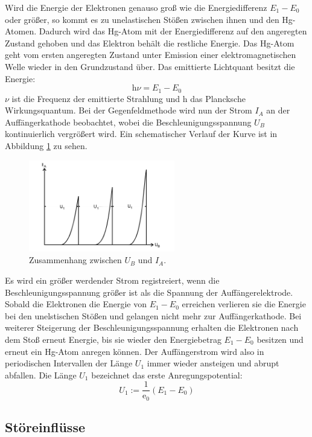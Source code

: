Wird die Energie der Elektronen genauso groß wie die Energiedifferenz $E_1 -E_0$ oder größer, so kommt es zu unelastischen Stößen zwischen ihnen und den Hg-Atomen.
Dadurch wird das Hg-Atom mit der Energiedifferenz auf den angeregten Zustand gehoben und das Elektron behält die restliche Energie.
Das Hg-Atom geht vom ersten angeregten Zustand unter Emission einer elektromagnetischen Welle wieder in den Grundzustand über.
Das emittierte Lichtquant besitzt die Energie:
\begin{equation}
    \text{h} \nu = E_1 - E_0
    \label{eqn:gl3}
\end{equation}
$\nu$ ist die Frequenz der emittierte Strahlung und h das Plancksche Wirkungsquantum.
Bei der Gegenfeldmethode wird nun der Strom $I_A$ an der Auffängerkathode beobachtet, wobei die Beschleunigungsspannung $U_B$ kontinuierlich vergrößert wird. 
Ein schematischer Verlauf der Kurve ist in Abbildung \ref{fig:abb2} zu sehen. 
\begin{figure}
    \centering
    \includegraphics[height=4.0cm]{data/abb2.jpg}
    \caption{Zusammenhang zwischen $U_B$ und $I_A$.  \cite{V601}}
    \label{fig:abb2}
\end{figure}
Es wird ein größer werdender Strom registreiert, wenn die Beschleunigungsspannung größer ist als die Spannung der Auffängerelektrode.
Sobald die Elektronen die Energie von $E_1 - E_0$ erreichen verlieren sie die Energie bei den unelstischen Stößen und gelangen nicht mehr zur Auffängerkathode.
Bei weiterer Steigerung der Beschleunigungsspannung erhalten die Elektronen nach dem Stoß erneut Energie, bis sie wieder den Energiebetrag $E_1 -E_0$ besitzen und erneut ein Hg-Atom anregen können.
Der Auffängerstrom wird also in periodischen Intervallen der Länge $U_1$ immer wieder ansteigen und abrupt abfallen. 
Die Länge $U_1$ bezeichnet das erste Anregungspotential:
\begin{equation}
    U_1 := \frac{1}{\text{e}_0}(E_1 - E_0)
    \label{eqn:gl4}
\end{equation}

\subsection{Störeinflüsse}
\label{Stoer}


